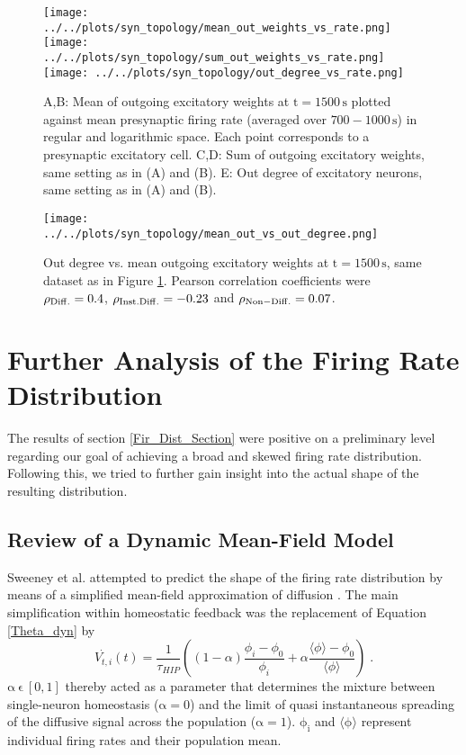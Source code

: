 \documentclass[10pt,a4paper]{article}
\begin{document}
\begin{figure}
\texttt{[image: ../../plots/syn\_topology/mean\_out\_weights\_vs\_rate.png]}
\texttt{[image: ../../plots/syn\_topology/sum\_out\_weights\_vs\_rate.png]}
\texttt{[image: ../../plots/syn\_topology/out\_degree\_vs\_rate.png]}
\caption{A,B: Mean of outgoing excitatory weights at $\mathrm{t=1500\,s}$ plotted against mean presynaptic firing rate (averaged over $\mathrm{700-1000\,s}$) in regular and logarithmic space. Each point corresponds to a presynaptic excitatory cell. C,D: Sum of outgoing excitatory weights, same setting as in (A) and (B). E: Out degree of excitatory neurons, same setting as in (A) and (B).
}
\label{Out_Weight_vs_F}
\end{figure}

\begin{figure}
\texttt{[image: ../../plots/syn\_topology/mean\_out\_vs\_out\_degree.png]}
\caption{Out degree vs. mean outgoing excitatory weights at $\mathrm{t=1500\,s}$, same dataset as in Figure \ref{Out_Weight_vs_F}. Pearson correlation coefficients were $\rho_{\rm Diff.} =  0.4$, $\rho_{\rm Inst. Diff.} =  -0.23$ and $\rho_{\rm Non-Diff.} =  0.07$.}
\label{Mean_Weight_vs_Out_Degree}
\end{figure}


\newpage
\section{Further Analysis of the Firing Rate Distribution}
The results of section \ref{Fir_Dist_Section} were positive on a preliminary level regarding our goal of achieving a broad and skewed firing rate distribution. Following this, we tried to further gain insight into the actual shape of the resulting distribution. 
\subsection{Review of a Dynamic Mean-Field Model}\label{Mean_Field_Review_Section}
Sweeney et al. attempted to predict the shape of the firing rate distribution by means of a simplified mean-field approximation of diffusion \cite{Sweeney_Paper}. The main simplification within homeostatic feedback was the replacement of Equation \ref{Theta_dyn} by
\begin{equation}
\dot{V_{t,i}}(t) = \frac{1}{\tau_{HIP}} \left( (1-\alpha)\frac{\phi_i-\phi_0}{\phi_i} +\alpha \frac{\langle \phi \rangle-\phi_0}{\langle \phi \rangle} \right)\;. 
\label{diff_hom_simpl_sweeney}
\end{equation}
$\mathrm{\alpha \: \epsilon \: [0,1]}$ thereby acted as a parameter that determines the mixture between single-neuron homeostasis ($\mathrm{\alpha=0}$) and the limit of quasi instantaneous spreading of the diffusive signal across the population ($\mathrm{\alpha=1}$). $\mathrm{\phi_i}$ and $\mathrm{\mathrm{\langle \phi \rangle}}$ represent individual firing rates and their population mean.
\end{document}
